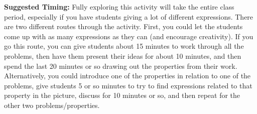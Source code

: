 \documentclass{ximera}
\begin{document}
\begin{instructorNotes}
{\bf Suggested Timing:} Fully exploring this activity will take the entire class period, especially if you have students giving a lot of different expressions. There are two different routes through the activity. First, you could let the students come up with as many expressions as they can (and encourage creativity). If you go this route, you can give students about 15 minutes to work through all the problems, then have them present their ideas for about 10 minutes, and then spend the last 20 minutes or so drawing out the properties from their work. Alternatively, you could introduce one of the properties in relation to one of the problems, give students 5 or so minutes to try to find expressions related to that property in the picture, discuss for 10 minutes or so, and then repeat for the other two problems/properties.
\end{instructorNotes}
\end{document}

